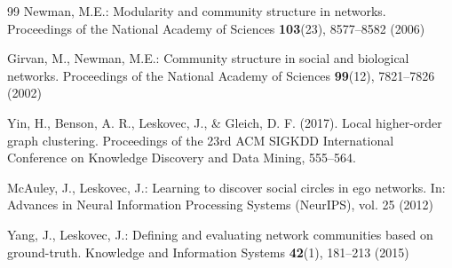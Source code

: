 \documentclass{svproc}
\begin{document}
\begin{thebibliography}{99}
Newman, M.E.: Modularity and community structure in networks. Proceedings of the National Academy of Sciences \textbf{103}(23), 8577--8582 (2006)

Girvan, M., Newman, M.E.: Community structure in social and biological networks. Proceedings of the National Academy of Sciences \textbf{99}(12), 7821--7826 (2002)

Yin, H., Benson, A. R., Leskovec, J., \& Gleich, D. F. (2017). Local higher-order graph clustering. Proceedings of the 23rd ACM SIGKDD International Conference on Knowledge Discovery and Data Mining, 555–564.

McAuley, J., Leskovec, J.: Learning to discover social circles in ego networks. In: Advances in Neural Information Processing Systems (NeurIPS), vol. 25 (2012)

Yang, J., Leskovec, J.: Defining and evaluating network communities based on ground-truth. Knowledge and Information Systems \textbf{42}(1), 181--213 (2015)

\end{thebibliography}
\end{document}
